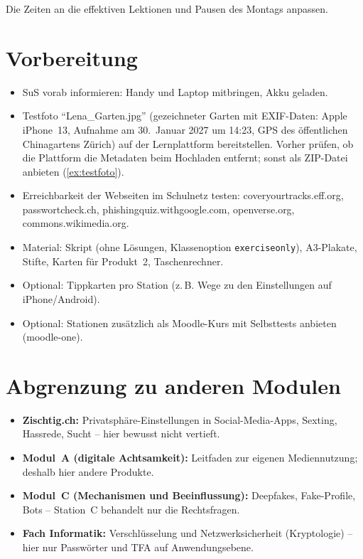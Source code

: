 Die Zeiten an die effektiven Lektionen und Pausen des Montags anpassen.

\section{Vorbereitung}

\begin{itemize}
	\item SuS vorab informieren: Handy und Laptop mitbringen, Akku geladen.
	\item Testfoto \enquote{Lena\_Garten.jpg} (gezeichneter Garten mit \acrshort{EXIF}-Daten: Apple iPhone~13, Aufnahme am 30.~Januar 2027 um 14:23, \acrshort{GPS} des öffentlichen Chinagartens Zürich) auf der Lernplattform bereitstellen. Vorher prüfen, ob die Plattform die Metadaten beim Hochladen entfernt; sonst als ZIP-Datei anbieten (\cref{ex:testfoto}).
	\item Erreichbarkeit der Webseiten im Schulnetz testen: coveryourtracks.eff.org, passwortcheck.ch, phishingquiz.withgoogle.com, openverse.org, commons.wikimedia.org.
	\item Material: Skript (ohne Lösungen, Klassenoption \texttt{exerciseonly}), A3-Plakate, Stifte, Karten für Produkt~2, Taschenrechner.
	\item Optional: Tippkarten pro Station (z.\,B. Wege zu den Einstellungen auf iPhone/Android).
	\item Optional: Stationen zusätzlich als Moodle-Kurs mit Selbsttests anbieten (moodle-one).
\end{itemize}

\section{Abgrenzung zu anderen Modulen}

\begin{itemize}
	\item \textbf{Zischtig.ch:} Privatsphäre-Einstellungen in Social-Media-Apps, Sexting, Hassrede, Sucht -- hier bewusst nicht vertieft.
	\item \textbf{Modul~A (digitale Achtsamkeit):} Leitfaden zur eigenen Mediennutzung; deshalb hier andere Produkte.
	\item \textbf{Modul~C (Mechanismen und Beeinflussung):} Deepfakes, Fake-Profile, Bots -- Station~C behandelt nur die Rechtsfragen.
	\item \textbf{Fach Informatik:} Verschlüsselung und Netzwerksicherheit (Kryptologie) -- hier nur Passwörter und \gls{TFA} auf Anwendungsebene.
\end{itemize}

